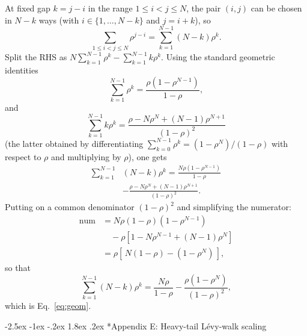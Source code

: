 \documentclass[11pt,a4paper]{article}
\makeatletter
\renewcommand\section{\@startsection{section}{1}{\z@}%
  {-2.5ex \@plus -1ex \@minus -.2ex}%
  {1.8ex \@plus.2ex}%
  {\normalfont\normalsize\bfseries\centering}}
\makeatother
\begin{document}
At fixed gap $k = j-i$ in the range $1 \le i < j \le N$, the pair
$(i,j)$ can be chosen in $N-k$ ways (with $i \in \{1,\dots,N-k\}$
and $j = i+k$), so
\begin{equation}
\sum_{1\le i<j\le N}\rho^{j-i}
 = \sum_{k=1}^{N-1}(N-k)\rho^k.
\label{eq:app-pairs}
\end{equation}
Split the RHS as $N\sum_{k=1}^{N-1}\rho^k - \sum_{k=1}^{N-1}k\rho^k$.
Using the standard geometric identities
\begin{equation}
\sum_{k=1}^{N-1}\rho^k = \frac{\rho(1-\rho^{N-1})}{1-\rho},
\end{equation}
and
\begin{equation}
\sum_{k=1}^{N-1}k\rho^k
 = \frac{\rho - N\rho^N + (N-1)\rho^{N+1}}{(1-\rho)^2}
\end{equation}
(the latter obtained by differentiating
$\sum_{k=0}^{N-1}\rho^k = (1-\rho^N)/(1-\rho)$ with respect to
$\rho$ and multiplying by $\rho$), one gets
\begin{align}
\sum_{k=1}^{N-1}&(N-k)\rho^k
 = \frac{N\rho(1-\rho^{N-1})}{1-\rho}
 \nonumber\\
 &- \frac{\rho - N\rho^N + (N-1)\rho^{N+1}}{(1-\rho)^2}.
\end{align}
Putting on a common denominator $(1-\rho)^2$ and simplifying the
numerator:
\begin{align}
\mathrm{num} &= N\rho(1-\rho)(1-\rho^{N-1})
 \nonumber\\
 &\quad - \rho[1 - N\rho^{N-1} + (N-1)\rho^N]
 \nonumber\\
 &= \rho[\,N(1-\rho) - (1 - \rho^N)\,],
\end{align}
so that
\begin{equation}
\sum_{k=1}^{N-1}(N-k)\rho^k
 = \frac{N\rho}{1-\rho} - \frac{\rho(1-\rho^N)}{(1-\rho)^2},
\end{equation}
which is Eq.~\eqref{eq:geom}.

\section*{Appendix E: Heavy-tail L\'evy-walk scaling}
\label{app:levy}
\end{document}
